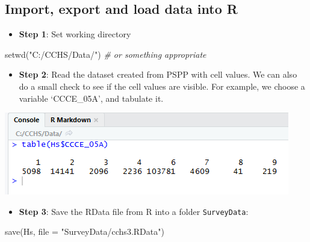 \documentclass[
]{book}
\newenvironment{Shaded}{\begin{snugshade}}{\end{snugshade}}
\newcommand{\AttributeTok}[1]{\textcolor[rgb]{0.77,0.63,0.00}{#1}}
\newcommand{\CommentTok}[1]{\textcolor[rgb]{0.56,0.35,0.01}{\textit{#1}}}
\newcommand{\ConstantTok}[1]{\textcolor[rgb]{0.00,0.00,0.00}{#1}}
\newcommand{\FunctionTok}[1]{\textcolor[rgb]{0.00,0.00,0.00}{#1}}
\newcommand{\NormalTok}[1]{#1}
\newcommand{\OtherTok}[1]{\textcolor[rgb]{0.56,0.35,0.01}{#1}}
\newcommand{\SpecialCharTok}[1]{\textcolor[rgb]{0.00,0.00,0.00}{#1}}
\newcommand{\StringTok}[1]{\textcolor[rgb]{0.31,0.60,0.02}{#1}}
\providecommand{\tightlist}{%
  \setlength{\itemsep}{0pt}\setlength{\parskip}{0pt}}
\begin{document}
\hypertarget{import-export-and-load-data-into-r}{%
\subsection{Import, export and load data into R}\label{import-export-and-load-data-into-r}}

\begin{itemize}
\tightlist
\item
  \textbf{Step 1}: Set working directory
\end{itemize}

\begin{Shaded}
\begin{Highlighting}[]
\FunctionTok{setwd}\NormalTok{(}\StringTok{"C:/CCHS/Data/"}\NormalTok{) }\CommentTok{\# or something appropriate}
\end{Highlighting}
\end{Shaded}

\begin{itemize}
\tightlist
\item
  \textbf{Step 2}: Read the dataset created from PSPP with cell values. We can also do a small check to see if the cell values are visible. For example, we choose a variable `CCCE\_05A', and tabulate it.
\end{itemize}

\begin{Shaded}
\end{Shaded}

\includegraphics[width=0.65\linewidth]{images/abacus46}

\begin{itemize}
\tightlist
\item
  \textbf{Step 3}: Save the RData file from R into a folder \texttt{SurveyData}:
\end{itemize}

\begin{Shaded}
\begin{Highlighting}[]
\FunctionTok{save}\NormalTok{(Hs, }\AttributeTok{file =} \StringTok{"SurveyData/cchs3.RData"}\NormalTok{)}
\end{Highlighting}
\end{Shaded}
\end{document}
